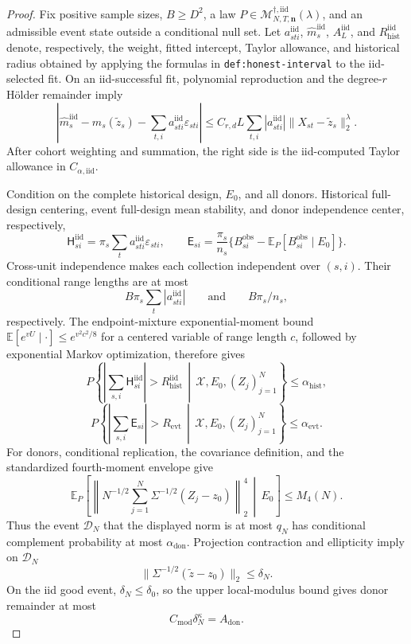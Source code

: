 \documentclass{article}
\begin{document}
\begin{proof}
Fix positive sample sizes, \(B\geq D^2\), a law
\(P\in\mathcal M_{N,T,\mathbf n}^{\dagger,\mathrm{iid}}(\lambda)\), and an admissible event state outside a conditional null set.  Let \(a_{sti}^{\mathrm{iid}}\), \(\widehat m_s^{\mathrm{iid}}\), \(A_L^{\mathrm{iid}}\), and \(R_{\mathrm{hist}}^{\mathrm{iid}}\) denote, respectively, the weight, fitted intercept, Taylor allowance, and historical radius obtained by applying the formulas in \texttt{def:honest-interval} to the iid-selected fit.  On an iid-successful fit, polynomial reproduction and the degree-\(r\) H\"older remainder imply
\[
\left|
\widehat m_s^{\mathrm{iid}}-m_s(\widetilde z_s)
-\sum_{t,i}a_{sti}^{\mathrm{iid}}\varepsilon_{sti}
\right|
\leq C_{r,d}L\sum_{t,i}|a_{sti}^{\mathrm{iid}}|
\|X_{st}-\widetilde z_s\|_2^\lambda.
\tag{106}
\]
After cohort weighting and summation, the right side is the iid-computed Taylor allowance in \(C_{\alpha,\mathrm{iid}}\).

Condition on the complete historical design, \(E_0\), and all donors.  Historical full-design centering, event full-design mean stability, and donor independence center, respectively,
\[
\mathsf H_{si}^{\mathrm{iid}}
=\pi_s\sum_ta_{sti}^{\mathrm{iid}}\varepsilon_{sti},
\qquad
\mathsf E_{si}
=\frac{\pi_s}{n_s}
\{B_{si}^{\mathrm{obs}}-\mathbb E_P[B_{si}^{\mathrm{obs}}\mid E_0]\}.
\]
Cross-unit independence makes each collection independent over \((s,i)\).  Their conditional range lengths are at most
\[
B\pi_s\sum_t|a_{sti}^{\mathrm{iid}}|
\qquad\text{and}\qquad
B\pi_s/n_s,
\]
respectively.  The endpoint-mixture exponential-moment bound
\(\mathbb E[e^{vU}\mid\cdot]\leq e^{v^2c^2/8}\) for a centered variable of range length \(c\), followed by exponential Markov optimization, therefore gives
\[
P\!\left\{
\left|\sum_{s,i}\mathsf H_{si}^{\mathrm{iid}}\right|>R_{\mathrm{hist}}^{\mathrm{iid}}
\,\middle|\,\mathscr X,E_0,(Z_j)_{j=1}^{N}\right\}
\leq\alpha_{\mathrm{hist}},
\tag{107}
\]
\[
P\!\left\{
\left|\sum_{s,i}\mathsf E_{si}\right|>R_{\mathrm{evt}}
\,\middle|\,\mathscr X,E_0,(Z_j)_{j=1}^{N}\right\}
\leq\alpha_{\mathrm{evt}}.
\tag{108}
\]
For donors, conditional replication, the covariance definition, and the standardized fourth-moment envelope give
\[
\mathbb E_P\!\left[
\left\|N^{-1/2}\sum_{j=1}^{N}\Sigma^{-1/2}(Z_j-z_0)\right\|_2^4
\,\middle|\,E_0\right]
\leq M_4(N).
\tag{109}
\]
Thus the event \(\mathcal D_N\) that the displayed norm is at most \(q_N\) has conditional complement probability at most \(\alpha_{\mathrm{don}}\).  Projection contraction and ellipticity imply on \(\mathcal D_N\)
\[
\|\Sigma^{-1/2}(\widetilde z-z_0)\|_2\leq\delta_N.
\tag{110}
\]
On the iid good event, \(\delta_N\leq\delta_0\), so the upper local-modulus bound gives donor remainder at most
\[
C_{\mathrm{mod}}\delta_N^\kappa=A_{\mathrm{don}}.
\tag{111}
\]


\end{proof}
\end{document}
